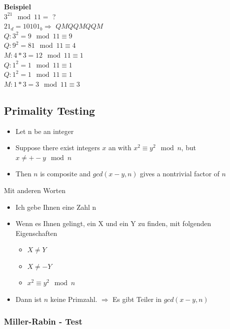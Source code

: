 \begin{tcolorbox}[colback=red!5!white,colframe=red!75!black]
    \textbf{Beispiel} \\
    $3^{21} \mod 11 =$ ? \\
    $21_d = 10101_b \Rightarrow $ \sout{$QM$}$QQMQQM$ \\
    $Q: 3^2 = 9 \mod 11 \equiv 9$ \\
    $Q: 9^2 = 81 \mod 11 \equiv 4$ \\
    $M: 4*3 = 12 \mod 11 \equiv 1$ \\
    $Q: 1^2 = 1 \mod 11 \equiv 1$ \\
    $Q: 1^2 = 1 \mod 11 \equiv 1$ \\
    $M: 1*3 = 3 \mod 11 \equiv 3$
\end{tcolorbox}

\hypertarget{primality-testing}{%
\subsection{Primality Testing}\label{primality-testing}}

\begin{itemize}
    \item Let n be an integer
    \item Suppose there exist integers $x$ an with $x^2 \equiv y^2 \mod n$, but $x \neq +-y \mod n$
    \item Then $n$ is composite and $gcd(x - y, n)$ gives a nontrivial factor of $n$
\end{itemize}
Mit anderen Worten

\begin{itemize}
\tightlist
\item
  Ich gebe Ihnen eine Zahl n
\item
  Wenn es Ihnen gelingt, ein X und ein Y zu finden, mit folgenden
  Eigenschaften
  \begin{itemize}
  \tightlist
  \item
    $X \neq Y$
  \item
    $X \neq-Y$
  \item
    $x^2 \equiv y^2 \mod n$
  \end{itemize}
\item
  Dann ist $n$ keine Primzahl. $\Rightarrow$ Es gibt Teiler in $gcd(x-y,n)$
\end{itemize}

\hypertarget{miller-rabin---basic-idea}{%
\subsubsection{Miller-Rabin - Test}\label{miller-rabin---basic-idea}}

